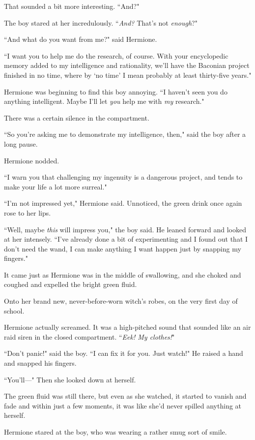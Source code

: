 That sounded a bit more interesting. ``And?"

The boy stared at her incredulously. ``\emph{And?} That's not \emph{enough}?"

``And what do you want from me?" said Hermione.

``I want you to help me do the research, of course. With your encyclopedic memory added to my intelligence and rationality, we'll have the Baconian project finished in no time, where by `no time' I mean probably at least thirty-five years."

Hermione was beginning to find this boy annoying. ``I haven't seen you do anything intelligent. Maybe I'll let \emph{you} help me with \emph{my} research."

There was a certain silence in the compartment.

``So you're asking me to demonstrate my intelligence, then," said the boy after a long pause.

Hermione nodded.

``I warn you that challenging my ingenuity is a dangerous project, and tends to make your life a lot more surreal."

``I'm not impressed yet," Hermione said. Unnoticed, the green drink once again rose to her lips.

``Well, maybe \emph{this} will impress you," the boy said. He leaned forward and looked at her intensely. ``I've already done a bit of experimenting and I found out that I don't need the wand, I can make anything I want happen just by snapping my fingers."

It came just as Hermione was in the middle of swallowing, and she choked and coughed and expelled the bright green fluid.

Onto her brand new, never-before-worn witch's robes, on the very first day of school.

Hermione actually screamed. It was a high-pitched sound that sounded like an air raid siren in the closed compartment. ``\emph{Eek! My clothes!}"

``Don't panic!" said the boy. ``I can fix it for you. Just watch!" He raised a hand and snapped his fingers.

``You'll—" Then she looked down at herself.

The green fluid was still there, but even as she watched, it started to vanish and fade and within just a few moments, it was like she'd never spilled anything at herself.

Hermione stared at the boy, who was wearing a rather smug sort of smile.

